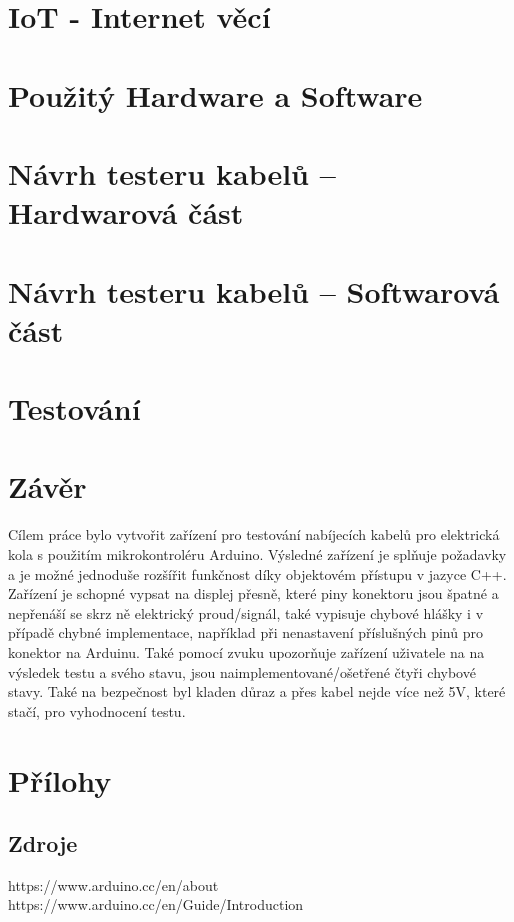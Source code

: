 \documentclass[12pt,a4paper,titlepage]{scrreprt}
\begin{document}
	\chapter{IoT - Internet věcí}
	
	
	
	
	\chapter{Použitý Hardware a Software}
	
	
	
	
	
	
	\chapter{Návrh testeru kabelů – Hardwarová část}
	
	
	
	\chapter{Návrh testeru kabelů – Softwarová část}
	
	
	
	
	\chapter{Testování}
	
	
	
	\chapter{Závěr}
	Cílem práce bylo vytvořit zařízení pro testování nabíjecích kabelů pro elektrická kola s použitím mikrokontroléru Arduino. Výsledné zařízení je splňuje požadavky a je možné jednoduše rozšířit funkčnost díky objektovém přístupu v jazyce C++. Zařízení je schopné vypsat na displej přesně, které piny konektoru jsou špatné a nepřenáší se skrz ně elektrický proud/signál, také vypisuje chybové hlášky i v případě chybné implementace, například při nenastavení příslušných pinů pro konektor na Arduinu. Také pomocí zvuku upozorňuje zařízení uživatele na na výsledek testu a svého stavu, jsou naimplementované/ošetřené čtyři chybové stavy. Také na bezpečnost byl kladen důraz a přes kabel nejde více než 5V, které stačí, pro vyhodnocení testu.

	\newpage
	\chapter{Přílohy}
	\section*{Zdroje}
	https://www.arduino.cc/en/about
	https://www.arduino.cc/en/Guide/Introduction
	
\end{document}
